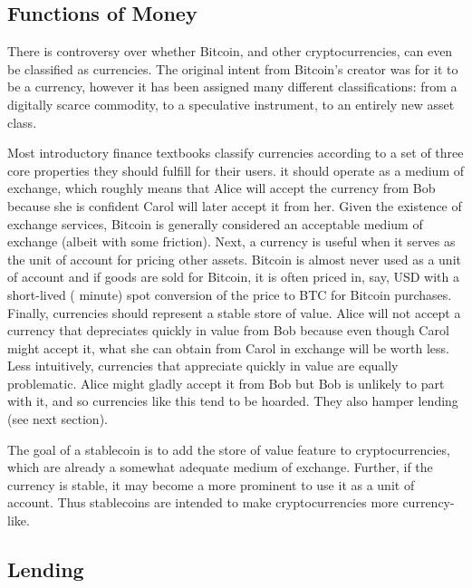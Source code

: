 \subsection{Functions of Money}

There is controversy over whether Bitcoin, and other cryptocurrencies, can even be classified as currencies. The original intent from Bitcoin's creator was for it to be a currency, however it has been assigned many different classifications: from a digitally scarce commodity, to a speculative instrument, to an entirely new asset class.

Most introductory finance textbooks classify currencies according to a set of three core properties they should fulfill for their users. it should operate as a medium of exchange, which roughly means that Alice will accept the currency from Bob because she is confident Carol will later accept it from her. Given the existence of exchange services, Bitcoin is generally considered an acceptable medium of exchange (albeit with some friction). Next, a currency is useful when it serves as the unit of account for pricing other assets. Bitcoin is almost never used as a unit of account and if goods are sold for Bitcoin, it is often priced in, say, USD with a short-lived ( minute) spot conversion of the price to BTC for Bitcoin purchases. Finally, currencies should represent a stable store of value. Alice will not accept a currency that depreciates quickly in value from Bob because even though Carol might accept it, what she can obtain from Carol in exchange will be worth less. Less intuitively, currencies that appreciate quickly in value are equally problematic. Alice might gladly accept it from Bob but Bob is unlikely to part with it, and so currencies like this tend to be hoarded. They also hamper lending (see next section).

The goal of a stablecoin is to add the store of value feature to cryptocurrencies, which are already a somewhat adequate medium of exchange. Further, if the currency is stable, it may become a more prominent to use it as a unit of account. Thus stablecoins are intended to make cryptocurrencies more currency-like.~\cite{rogoff2017curse}


\subsection{Lending}

